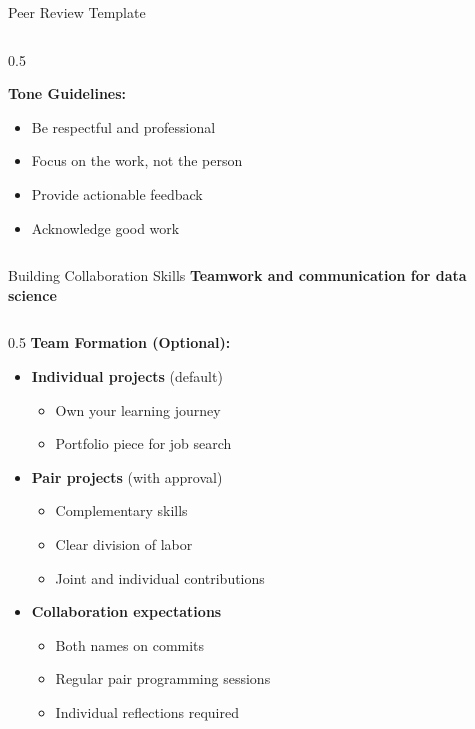 \begin{frame}[fragile]{Peer Review Template}
\begin{columns}
\begin{column}{0.5\textwidth}
\vspace{0.2cm}

\textbf{Tone Guidelines:}
\begin{itemize}
\item Be respectful and professional
\item Focus on the work, not the person
\item Provide actionable feedback
\item Acknowledge good work
\end{itemize}
\end{column}
\end{columns}
\end{frame}


\begin{frame}{Building Collaboration Skills}
\textbf{Teamwork and communication for data science}

\begin{columns}
\begin{column}{0.5\textwidth}
\textbf{Team Formation (Optional):}

\begin{itemize}
\item \textbf{Individual projects} (default)
   \begin{itemize}
   \item Own your learning journey
   \item Portfolio piece for job search
   \end{itemize}

\item \textbf{Pair projects} (with approval)
   \begin{itemize}
   \item Complementary skills
   \item Clear division of labor
   \item Joint and individual contributions
   \end{itemize}

\item \textbf{Collaboration expectations}
   \begin{itemize}
   \item Both names on commits
   \item Regular pair programming sessions
   \item Individual reflections required
   \end{itemize}
\end{itemize}


\end{column}
\end{columns}
\end{frame}
